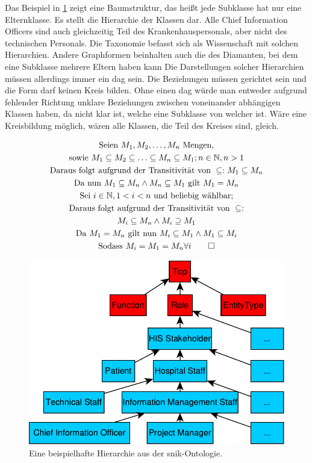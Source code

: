 Das Beispiel in \cref{fig:snikhierarchy} zeigt eine Baumstruktur, das heißt jede Subklasse hat nur eine Elternklasse.
Es stellt die Hierarchie der Klassen dar.
Alle Chief Information Officers sind auch gleichzeitig Teil des Krankenhauspersonals, aber nicht des technischen Personals.
Die Taxonomie befasst sich als Wissenschaft mit solchen Hierarchien.
Andere Graphformen beinhalten auch die des Diamanten, bei dem eine Subklasse mehrere Eltern haben kann
Die Darstellungen solcher Hierarchien müssen allerdings immer ein \ac{dag} sein.
Die Beziehungen müssen gerichtet sein und die Form darf keinen Kreis bilden.
Ohne einen \ac{dag} würde man entweder aufgrund fehlender Richtung unklare Beziehungen zwischen voneinander abhängigen Klassen haben, da nicht klar ist, welche eine Subklasse von welcher ist.
Wäre eine Kreisbildung möglich, wären alle Klassen, die Teil des Kreises sind, gleich.

\begin{gather*}
\text{Seien } M_1, M_2, \ldots, M_n \text{ Mengen,} \\
\text{sowie } M_1 \subseteq M_2 \subseteq \ldots \subseteq M_n \subseteq M_1; n \in \mathbb{N}, n > 1 \\
\text{Daraus folgt aufgrund der Transitivität von } \subseteq: M_1 \subseteq M_n \\
\text{Da nun } M_1 \subseteq M_n \land M_n \subseteq M_1 \text{ gilt } M_1 = M_n \\
\text{Sei } i \in \mathbb{N}, 1 < i < n \text{ und beliebig wählbar;} \\
\text{Daraus folgt aufgrund der Transitivität von } \subseteq: \\
M_i \subseteq M_n \land M_i \supseteq M_1 \\
\text{Da } M_1 = M_n \text{ gilt nun } M_i \subseteq M_1 \land M_1 \subseteq M_i \\
\text{Sodass } M_i = M_1 = M_n \forall i \qed \\
\end{gather*}

\begin{figure}%
\centering
\includegraphics[width=\textwidth, height=\textheight, keepaspectratio]{Images/hierarchy.pdf}
\caption[Beispiel für Hierarchie]{Eine beispielhafte Hierarchie aus der \ac{snik}-Ontologie.}
\label{fig:snikhierarchy}
\end{figure}

